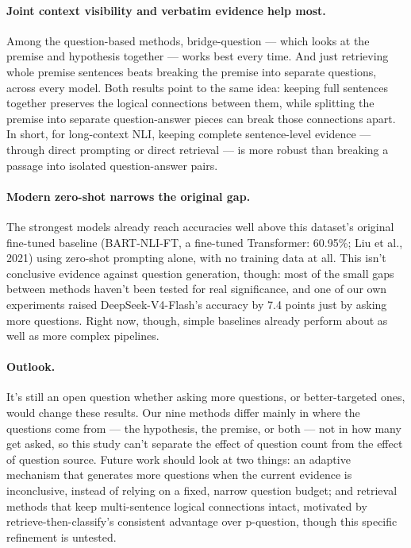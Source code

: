 \documentclass[11pt]{article}
\begin{document}
\paragraph{Joint context visibility and verbatim evidence help most.}
Among the question-based methods, bridge-question --- which looks at the
premise and hypothesis together --- works best every time. And just
retrieving whole premise sentences beats breaking the premise into separate
questions, across every model. Both results point to the same idea:
keeping full sentences together preserves the logical connections between
them, while splitting the premise into separate question-answer pieces can
break those connections apart. In short, for long-context NLI, keeping
complete sentence-level evidence --- through direct prompting or direct
retrieval --- is more robust than breaking a passage into isolated
question-answer pairs.

\paragraph{Modern zero-shot narrows the original gap.} The strongest
models already reach accuracies well above this dataset's original
fine-tuned baseline (BART-NLI-FT, a fine-tuned Transformer: 60.95\%; Liu et
al., 2021) using zero-shot prompting alone, with no training data at all.
This isn't conclusive evidence against question generation, though: most
of the small gaps between methods haven't been tested for real
significance, and one of our own experiments raised DeepSeek-V4-Flash's
accuracy by 7.4 points just by asking more questions. Right now, though,
simple baselines already perform about as well as more complex pipelines.

\paragraph{Outlook.} It's still an open question whether asking more
questions, or better-targeted ones, would change these results. Our nine
methods differ mainly in where the questions come from --- the hypothesis,
the premise, or both --- not in how many get asked, so this study can't
separate the effect of question count from the effect of question source.
Future work should look at two things: an adaptive mechanism that generates
more questions when the current evidence is inconclusive, instead of
relying on a fixed, narrow question budget; and retrieval methods that keep
multi-sentence logical connections intact, motivated by
retrieve-then-classify's consistent advantage over p-question, though this
specific refinement is untested.
\end{document}
